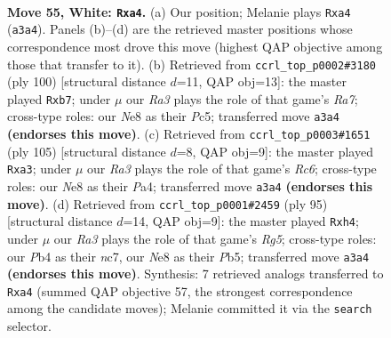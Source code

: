 \documentclass[11pt]{article}
\begin{document}
\clearpage

\begin{figure}[p]\centering
\begin{subfigure}{0.46\textwidth}\centering
\resizebox{\linewidth}{!}{%
\newchessgame
\chessboard[
  setfen={4Nk2/8/8/4p3/pP4r1/R3K3/8/8 w - - 0 55},
  showmover=false,
  pgfstyle=straightmove, color=movearrow, markmove={a3-a4}
]}
\caption{}
\end{subfigure}\hfill
\begin{subfigure}{0.46\textwidth}\centering
\resizebox{\linewidth}{!}{%
\newchessgame
\chessboard[
  setfen={8/Rp6/5p2/2P5/2k2K2/8/4P3/6r1 w - - 3 51},
  showmover=false,
  pgfstyle=straightmove, color=movearrow, markmove={a7-b7}
]}
\caption{}
\end{subfigure}
\\[4pt]
\begin{subfigure}{0.46\textwidth}\centering
\resizebox{\linewidth}{!}{%
\newchessgame
\chessboard[
  setfen={8/7R/2k5/K7/p3P2p/P1r5/8/8 b - - 1 53},
  showmover=false,
  pgfstyle=straightmove, color=movearrow, markmove={c3-a3}
]}
\caption{}
\end{subfigure}\hfill
\begin{subfigure}{0.46\textwidth}\centering
\resizebox{\linewidth}{!}{%
\newchessgame
\chessboard[
  setfen={8/2N3k1/8/pp2R3/6rP/8/3K4/8 b - - 0 48},
  showmover=false,
  pgfstyle=straightmove, color=movearrow, markmove={g4-h4}
]}
\caption{}
\end{subfigure}
\caption{\textbf{Move 55, White: \texttt{Rxa4}.} (a) Our position; Melanie plays \texttt{Rxa4} (\texttt{a3a4}). Panels (b)--(d) are the retrieved master positions whose correspondence most drove this move (highest QAP objective among those that transfer to it). (b) Retrieved from \texttt{ccrl\_top\_p0002\#3180} (ply 100) [structural distance $d$=11, QAP obj=13]: the master played \texttt{Rxb7}; under $\mu$ our \emph{Ra3} plays the role of that game's \emph{Ra7}; cross-type roles: our \emph{N}e8 as their \emph{P}c5; transferred move \texttt{a3a4} \textbf{(endorses this move)}. (c) Retrieved from \texttt{ccrl\_top\_p0003\#1651} (ply 105) [structural distance $d$=8, QAP obj=9]: the master played \texttt{Rxa3}; under $\mu$ our \emph{Ra3} plays the role of that game's \emph{Rc6}; cross-type roles: our \emph{N}e8 as their \emph{P}a4; transferred move \texttt{a3a4} \textbf{(endorses this move)}. (d) Retrieved from \texttt{ccrl\_top\_p0001\#2459} (ply 95) [structural distance $d$=14, QAP obj=9]: the master played \texttt{Rxh4}; under $\mu$ our \emph{Ra3} plays the role of that game's \emph{Rg5}; cross-type roles: our \emph{P}b4 as their \emph{n}c7, our \emph{N}e8 as their \emph{P}b5; transferred move \texttt{a3a4} \textbf{(endorses this move)}. Synthesis: 7 retrieved analogs transferred to \texttt{Rxa4} (summed QAP objective 57, the strongest correspondence among the candidate moves); Melanie committed it via the \texttt{search} selector.}
\label{fig:thought-m108}
\end{figure}
\end{document}
